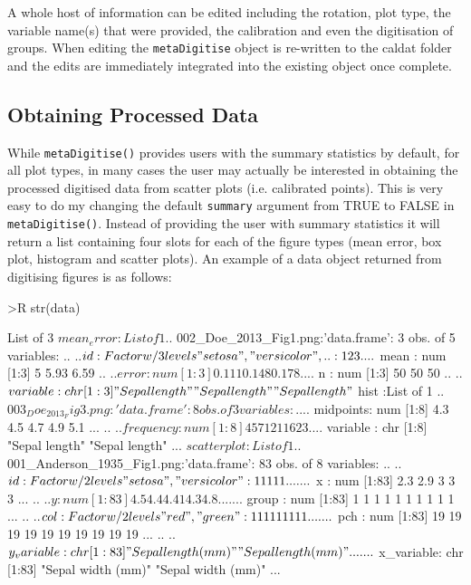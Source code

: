 \documentclass[12pt]{article}
\newcommand{\code}[1]{\texttt{#1}}
\newcommand{\fct}[1]{\texttt{#1()}}
\begin{document}
A whole host of information can be edited including the rotation, plot type, the variable name(s) that were provided, the calibration and even the digitisation of groups. When editing the \code{metaDigitise} object is re-written to the caldat folder and the edits are immediately integrated into the existing object once complete. 

\subsection{Obtaining Processed Data}

While \fct{metaDigitise} provides users with the summary statistics by default, for all plot types, in many cases the user may actually be interested in obtaining the processed digitised data from scatter plots (i.e. calibrated points). This is very easy to do my changing the default \code{summary} argument from TRUE to FALSE in \fct{metaDigitise}. Instead of providing the user with summary statistics it will return a list containing four slots for each of the figure types (mean error, box plot, histogram and scatter plots). An example of a data object returned from digitising figures is as follows:

\begin{CodeChunk}

\begin{CodeInput}
>R str(data)
\end{CodeInput}

\begin{CodeOutput}
List of 3
 $ mean_error :List of 1
  ..$ 002_Doe_2013_Fig1.png:'data.frame': 3 obs. of  5 variables:
  .. ..$ id      : Factor w/ 3 levels "setosa","versicolor",..: 1 2 3
  .. ..$ mean    : num [1:3] 5 5.93 6.59
  .. ..$ error   : num [1:3] 0.111 0.148 0.178
  .. ..$ n       : num [1:3] 50 50 50
  .. ..$ variable: chr [1:3] "Sepal length" "Sepal length" "Sepal length"
 $ hist       :List of 1
  ..$ 003_Doe_2013_Fig3.png:'data.frame': 8 obs. of  3 variables:
  .. ..$ midpoints: num [1:8] 4.3 4.5 4.7 4.9 5.1 ...
  .. ..$ frequency: num [1:8] 4 5 7 12 11 6 2 3
  .. ..$ variable : chr [1:8] "Sepal length" "Sepal length" ...
 $ scatterplot:List of 1
  ..$ 001_Anderson_1935_Fig1.png:'data.frame':  83 obs. of  8 variables:
  .. ..$ id        : Factor w/ 2 levels "setosa","versicolor": 1 1 1 1 1 ...
  .. ..$ x         : num [1:83] 2.3 2.9 3 3 3 ...
  .. ..$ y         : num [1:83] 4.5 4.4 4.41 4.3 4.8 ...
  .. ..$ group     : num [1:83] 1 1 1 1 1 1 1 1 1 1 ...
  .. ..$ col       : Factor w/ 2 levels "red","green": 1 1 1 1 1 1 1 1 1 ...
  .. ..$ pch       : num [1:83] 19 19 19 19 19 19 19 19 19 19 ...
  .. ..$ y_variable: chr [1:83] "Sepal length (mm)" "Sepal length (mm)"  ...
  .. ..$ x_variable: chr [1:83] "Sepal width (mm)" "Sepal width (mm)"    ...
\end{CodeOutput}
\end{CodeChunk}
\end{document}
